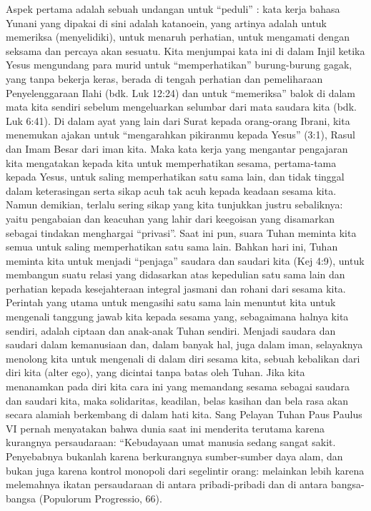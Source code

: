 Aspek pertama adalah sebuah undangan untuk ``peduli'' : kata kerja bahasa Yunani yang dipakai di sini adalah katanoein, yang artinya adalah untuk memeriksa (menyelidiki), untuk menaruh perhatian, untuk mengamati dengan seksama dan percaya akan sesuatu. Kita menjumpai kata ini di dalam Injil ketika Yesus mengundang para murid untuk ``memperhatikan'' burung-burung gagak, yang tanpa bekerja keras, berada di tengah perhatian dan pemeliharaan Penyelenggaraan Ilahi (bdk. Luk 12:24) dan untuk ``memeriksa'' balok di dalam mata kita sendiri sebelum mengeluarkan selumbar dari mata saudara kita (bdk. Luk 6:41). Di dalam ayat yang lain dari Surat kepada orang-orang Ibrani, kita menemukan ajakan untuk ``mengarahkan pikiranmu kepada Yesus'' (3:1), Rasul dan Imam Besar dari iman kita. Maka kata kerja yang mengantar pengajaran kita mengatakan kepada kita untuk memperhatikan sesama, pertama-tama kepada Yesus, untuk saling memperhatikan satu sama lain, dan tidak tinggal dalam keterasingan serta sikap acuh tak acuh kepada keadaan sesama kita. Namun demikian, terlalu sering sikap yang kita tunjukkan justru sebaliknya: yaitu pengabaian dan keacuhan yang lahir dari keegoisan yang disamarkan sebagai tindakan menghargai ``privasi''. Saat ini pun, suara Tuhan meminta kita semua untuk saling memperhatikan satu sama lain. Bahkan hari ini, Tuhan meminta kita untuk menjadi ``penjaga'' saudara dan saudari kita (Kej 4:9), untuk membangun suatu relasi yang didasarkan atas kepedulian satu sama lain dan perhatian kepada kesejahteraan integral jasmani dan rohani dari sesama kita. Perintah yang utama untuk mengasihi satu sama lain menuntut kita untuk mengenali tanggung jawab kita kepada sesama yang, sebagaimana halnya kita sendiri, adalah ciptaan dan anak-anak Tuhan sendiri. Menjadi saudara dan saudari dalam kemanusiaan dan, dalam banyak hal,  juga dalam iman, selayaknya menolong kita untuk mengenali di dalam diri sesama kita, sebuah kebalikan dari diri kita (alter ego), yang dicintai tanpa batas oleh Tuhan. Jika kita menanamkan pada diri kita cara ini yang memandang sesama sebagai saudara dan saudari kita, maka solidaritas, keadilan, belas kasihan dan bela rasa akan secara alamiah berkembang di dalam hati kita. Sang Pelayan Tuhan Paus Paulus VI pernah menyatakan bahwa dunia saat ini menderita terutama karena kurangnya persaudaraan: ``Kebudayaan umat manusia sedang sangat sakit. Penyebabnya bukanlah karena berkurangnya sumber-sumber daya alam, dan bukan juga karena kontrol monopoli dari segelintir orang: melainkan lebih karena melemahnya ikatan persaudaraan di antara pribadi-pribadi dan di antara bangsa-bangsa (Populorum Progressio, 66).

